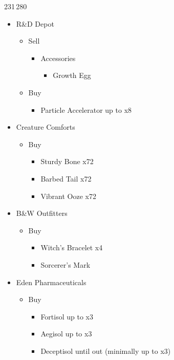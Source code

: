 \begin{shop}{231\,280}
	\begin{itemize}
		\item R\&D Depot
			\begin{itemize}
				\item Sell
					\begin{itemize}
						\item Accessories
							\begin{itemize}
								\item Growth Egg
							\end{itemize}
					\end{itemize}
				\item Buy
					\begin{itemize}
						\item Particle Accelerator up to x8
					\end{itemize}
			\end{itemize}
		\item Creature Comforts
			\begin{itemize}
				\item Buy
					\begin{itemize}
						\item Sturdy Bone x72
						\item Barbed Tail x72
						\item Vibrant Ooze x72
					\end{itemize}
			\end{itemize}
		\item B\&W Outfitters
			\begin{itemize}
				\item Buy
					\begin{itemize}
						\item Witch's Bracelet x4
						\item Sorcerer's Mark
					\end{itemize}
			\end{itemize}
		\item Eden Pharmaceuticals
			\begin{itemize}
				\item Buy
					\begin{itemize}
						\item Fortisol up to x3
						\item Aegisol up to x3
						\item Deceptisol until out (minimally up to x3)
					\end{itemize}
			\end{itemize}						
	\end{itemize}
\end{shop}

